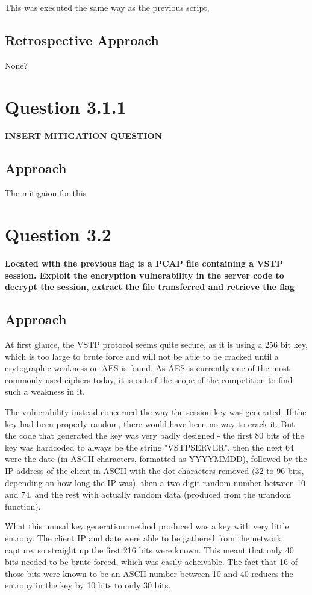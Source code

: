 This was executed the same way as the previous script, 

\subsection{Retrospective Approach}
None?

\section{Question 3.1.1}
\textbf{INSERT MITIGATION QUESTION}
\subsection{Approach}
The mitigaion for this 

\section{Question 3.2}
\textbf{Located with the previous flag is a PCAP file containing a VSTP session.
Exploit the encryption vulnerability in the server code to decrypt the session,
extract the file transferred and retrieve the flag}
\subsection{Approach}
At first glance, the VSTP protocol seems quite secure, as it is using a 256
bit key, which is too large to brute force and will not be able to be cracked
until a crytographic weakness on AES is found. As AES is currently one of the
most commonly used ciphers today, it is out of the scope of the competition to
find such a weakness in it.

The vulnerability instead concerned the way the session key was generated. If
the key had been properly random, there would have been no way to crack it. But
the code that generated the key was very badly designed - the first 80 bits of
the key was hardcoded to always be the string "VSTPSERVER", then the next 64
were the date (in ASCII characters, formatted as YYYYMMDD), followed by the IP
address of the client in ASCII with the dot characters removed (32 to 96 bits,
depending on how long the IP was), then a two digit random number between 10
and 74, and the rest with actually random data (produced from the urandom 
function).

What this unusal key generation method produced was a key with very little
entropy. The client IP and date were able to be gathered from the network
capture, so straight up the first 216 bits were known. This meant that
only 40 bits needed to be brute forced, which was easily acheivable. The
fact that 16 of those bits were known to be an ASCII number between 10
and 40 reduces the entropy in the key by 10 bits to only 30 bits.


